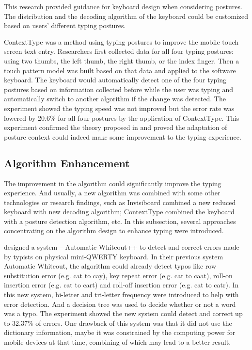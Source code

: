 \documentclass[11pt]{article}
\begin{document}
This research provided guidance for keyboard design when considering postures. The distribution and the decoding algorithm of the keyboard could be customized based on users' different typing postures.

ContextType \citep{10.1145/2470654.2481386} was a method using typing postures to improve the mobile touch screen text entry. Researchers first collected data for all four typing postures: using two thumbs, the left thumb, the right thumb, or the index finger. Then a touch pattern model was built based on that data and applied to the software keyboard. The keyboard would automatically detect one of the four typing postures based on information collected before while the user was typing and automatically switch to another algorithm if the change was detected. The experiment showed the typing speed was not improved but the error rate was lowered by 20.6\% for all four postures by the application of ContextType. This experiment confirmed the theory proposed in \citet{10.1145/2371574.2371612} and proved the adaptation of posture context could indeed make some improvement to the typing experience.

\subsection{Algorithm Enhancement}
The improvement in the algorithm could significantly improve the typing experience. And usually, a new algorithm was combined with some other technologies or research findings, such as Invisiboard \citep{10.1145/2935334.2935360} combined a new reduced keyboard with new decoding algorithm; ContextType \citep{10.1145/2470654.2481386} combined the keyboard with a posture detection algorithm, etc. In this subsection, several approaches concentrating on the algorithm design to enhance typing were introduced.

\citet{10.1145/1357054.1357147} designed a system -- Automatic Whiteout++ to detect and correct errors made by typists on physical mini-QWERTY keyboard. In their previous system Automatic Whiteout, the algorithm could already detect typos like row substitution error (e.g. cat to cay), key repeat error (e.g. cat to caat), roll-on insertion error (e.g. cat to cart) and roll-off insertion error (e.g. cat to catr). In this new system, bi-letter and tri-letter frequency were introduced to help with error detection. And a decision tree was used to decide whether or not a word was a typo. The experiment showed the new system could detect and correct up to 32.37\% of errors. One drawback of this system was that it did not use the dictionary information, maybe it was constrained by the computing power for mobile devices at that time, combining of which may lead to a better result.
\end{document}
